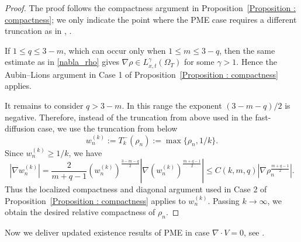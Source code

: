 \documentclass{amsart}
\numberwithin{equation}{section}
\begin{document}
\begin{proof}
The proof follows the compactness argument in Proposition~\ref{Proposition : compactness}; we only indicate the point where the PME case requires a different truncation as in \cite[Section~6.3.2]{BDG13}, \cite{HKKP}.

If $1\le q\le 3-m$, which can occur only when $1\le m\le 3-q$, then the same estimate as in \eqref{nabla_rho} gives $\nabla \rho \in L^\gamma_{x,t}(\Omega_T)$ 
for some $\gamma>1$. Hence the Aubin--Lions argument in Case 1 of Proposition~\ref{Proposition : compactness} applies.

It remains to consider $q>3-m$. In this range the exponent $(3-m-q)/2$ is negative. Therefore, instead of the truncation from above used in the fast-diffusion case, we use the truncation from below
\[
w_n^{(k)}:=T_k^{-}(\rho_n):=\max\{\rho_n,1/k\}.
\]
Since $w_n^{(k)}\ge 1/k$, we have
\[
|\nabla w_n^{(k)}|
=
\frac{2}{m+q-1}
\left(w_n^{(k)}\right)^{\frac{3-m-q}{2}}
\left|
\nabla \left(w_n^{(k)}\right)^{\frac{m+q-1}{2}}
\right|
\le
C(k,m,q)
\left|
\nabla \rho_n^{\frac{m+q-1}{2}}
\right|.
\]
Thus the localized compactness and diagonal argument used in Case 2 of Proposition~\ref{Proposition : compactness} applies to $w_n^{(k)}$. Passing $k\to\infty$, we obtain the desired relative compactness of $\rho_n$.
\end{proof}


Now we deliver updated existence results of PME in case $\nabla \cdot V = 0$, see \cite[Theorem~2.8 \& 2.10]{HKK02}. 
\end{document}
